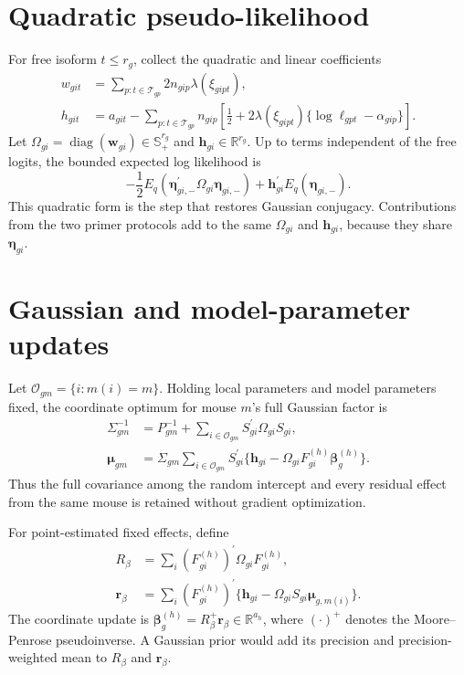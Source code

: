 \documentclass[11pt]{article}
\begin{document}
\section{Quadratic pseudo-likelihood}

For free isoform \(t\leq r_g\), collect the quadratic and linear coefficients \begin{align}
 w_{git}
 &=\sum_{p:t\in\mathcal T_{gp}}
 2n_{gip}\lambda(\xi_{gipt}),\\
 h_{git}
 &=a_{git}-\sum_{p:t\in\mathcal T_{gp}}n_{gip}
 \left[\frac12+2\lambda(\xi_{gipt})
 \{\log\ell_{gpt}-\alpha_{gip}\}\right].
\end{align}
Let \(\Omega_{gi}=\operatorname{diag}(\bm w_{gi})\in\mathbb S_+^{r_g}\) and \(\bm h_{gi}\in\mathbb R^{r_g}\). Up to terms independent of the free logits, the bounded expected log likelihood is \[
 -\frac12E_q(\bm\eta_{gi,-}^\prime\Omega_{gi}\bm\eta_{gi,-})
 +\bm h_{gi}^\prime E_q(\bm\eta_{gi,-}).
\]
This quadratic form is the step that restores Gaussian conjugacy. Contributions from the two primer protocols add to the same \(\Omega_{gi}\) and \(\bm h_{gi}\), because they share \(\bm\eta_{gi}\).

\section{Gaussian and model-parameter updates}

Let \(\mathcal O_{gm}=\{i:m(i)=m\}\). Holding local parameters and model parameters fixed, the coordinate optimum for mouse \(m\)'s full Gaussian factor is \begin{align}
 \Sigma_{gm}^{-1}
 &=P_{gm}^{-1}
 +\sum_{i\in\mathcal O_{gm}}S_{gi}^\prime\Omega_{gi}S_{gi},\\
 \bm\mu_{gm}
 &=\Sigma_{gm}\sum_{i\in\mathcal O_{gm}}S_{gi}^\prime
 \{\bm h_{gi}-\Omega_{gi}F_{gi}^{(h)}\bm\beta_g^{(h)}\}.
\end{align}
Thus the full covariance among the random intercept and every residual effect from the same mouse is retained without gradient optimization.

For point-estimated fixed effects, define \begin{align}
 R_\beta
 &=\sum_i(F_{gi}^{(h)})^\prime\Omega_{gi}F_{gi}^{(h)},\\
 \bm r_\beta
 &=\sum_i(F_{gi}^{(h)})^\prime
 \{\bm h_{gi}-\Omega_{gi}S_{gi}\bm\mu_{g,m(i)}\}.
\end{align}
The coordinate update is \(\bm\beta_g^{(h)}=R_\beta^+\bm r_\beta\in\mathbb R^{a_h}\), where \((\cdot)^+\) denotes the Moore--Penrose pseudoinverse. A Gaussian prior would add its precision and precision-weighted mean to \(R_\beta\) and \(\bm r_\beta\).
\end{document}
